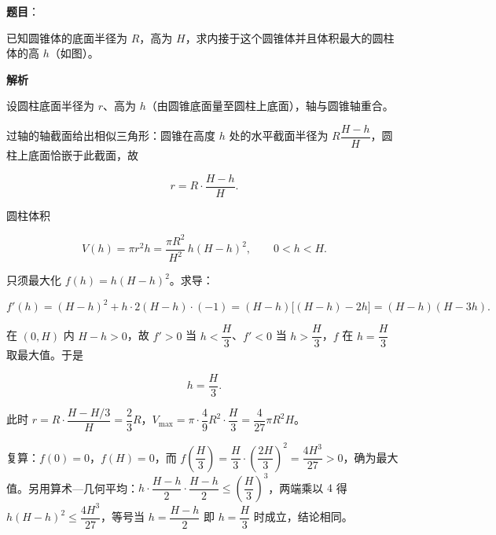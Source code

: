 \begin{answer}

\textbf{题目}：

已知圆锥体的底面半径为 $R$，高为 $H$，求内接于这个圆锥体并且体积最大的圆柱体的高 $h$（如图）。
\nopagebreak[4]
\begin{center}\end{center}
\nopagebreak[4]
\textbf{解析}
\nopagebreak[4]
\begin{center}\end{center}
\nopagebreak[4]
设圆柱底面半径为 $r$、高为 $h$（由圆锥底面量至圆柱上底面），轴与圆锥轴重合。

过轴的轴截面给出相似三角形：圆锥在高度 $h$ 处的水平截面半径为 $R\dfrac{H-h}{H}$，圆柱上底面恰嵌于此截面，故

\nopagebreak[4]
\[
r=R\cdot\frac{H-h}{H}.
\]

圆柱体积

\nopagebreak[4]
\[
V(h)=\pi r^2h=\frac{\pi R^2}{H^2}\,h(H-h)^2,\qquad 0<h<H.
\]

只须最大化 $f(h)=h(H-h)^2$。求导：

\nopagebreak[4]
\[
f'(h)=(H-h)^2+h\cdot2(H-h)\cdot(-1)=(H-h)\bigl[(H-h)-2h\bigr]=(H-h)(H-3h).
\]

在 $(0,H)$ 内 $H-h>0$，故 $f'>0$ 当 $h<\dfrac H3$、$f'<0$ 当 $h>\dfrac H3$，$f$ 在 $h=\dfrac H3$ 取最大值。于是

\nopagebreak[4]
\[
h=\frac H3.
\]

此时 $r=R\cdot\dfrac{H-H/3}{H}=\dfrac23R$，$V_{\max}=\pi\cdot\dfrac49R^2\cdot\dfrac H3=\dfrac{4}{27}\pi R^2H$。

复算：$f(0)=0$，$f(H)=0$，而 $f\!\left(\dfrac H3\right)=\dfrac H3\cdot\left(\dfrac{2H}{3}\right)^2=\dfrac{4H^3}{27}>0$，确为最大值。另用算术—几何平均：$h\cdot\dfrac{H-h}{2}\cdot\dfrac{H-h}{2}\leqslant\left(\dfrac{H}{3}\right)^3$，两端乘以 $4$ 得 $h(H-h)^2\leqslant\dfrac{4H^3}{27}$，等号当 $h=\dfrac{H-h}{2}$ 即 $h=\dfrac H3$ 时成立，结论相同。


\end{answer}
